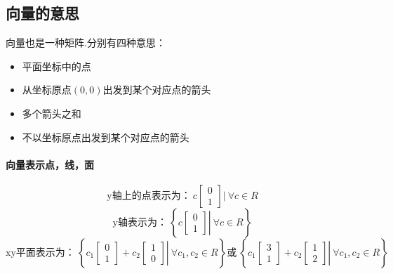 \documentclass[12pt]{article}
\begin{document}
\begin{CJK}{UTF8}{gbsn}
\section{向量的意思}
向量也是一种矩阵.分别有四种意思：
\begin{itemize}
\item 平面坐标中的点
\item 从坐标原点$(0, 0)$出发到某个对应点的箭头
\item 多个箭头之和
\item 不以坐标原点出发到某个对应点的箭头
\end{itemize}
\paragraph{向量表示点，线，面}
\begin{equation}
\text{y轴上的点表示为：}\ c\left[\begin{array}{c}
0\\
1
\end{array}\right]|\ \forall c \in R
\end{equation}
\begin{equation}
\text{y轴表示为：}\ \left\lbrace \left. c\left[\begin{array}{c}
0\\
1
\end{array}\right]\right|\ \forall c \in R \right\rbrace
\end{equation}
\begin{equation}
\text{xy平面表示为：}\ \left\lbrace \left. c_1\left[\begin{array}{c}
0\\
1
\end{array}\right]+c_2\left[\begin{array}{c}
1\\
0
\end{array}\right]\right|\ \forall c_1,c_2 \in R \right\rbrace
\text{或}
\ \left\lbrace \left. c_1\left[\begin{array}{c}
3\\
1
\end{array}\right]+c_2\left[\begin{array}{c}
1\\
2
\end{array}\right]\right|\ \forall c_1,c_2 \in R \right\rbrace
\end{equation}

\end{CJK}
\end{document}
